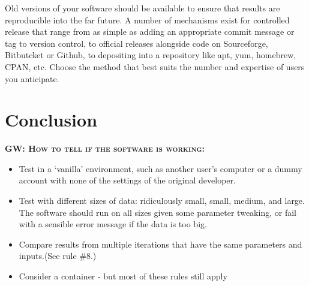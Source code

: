 \documentclass[10pt]{article}
\newcommand{\fixme}[2]{\textsc{\textbf{{#1}: {#2}}}}
\begin{document}
Old versions of your software should be available to ensure that results
are reproducible into the far future. A number of mechanisms exist for
controlled release that range from as simple as adding an appropriate
commit message or tag to version control, to official releases alongside
code on Sourceforge, Bitbutcket or Github, to depositing into a
repository like apt, yum, homebrew, CPAN, etc. Choose the method that
best suits the number and expertise of users you anticipate.

\section*{Conclusion}

\fixme{GW}{How to tell if the software is working:}

\begin{itemize}
\item
  Test in a `vanilla' environment, such as another user's computer or a
  dummy account with none of the settings of the original developer.
\item
  Test with different sizes of data: ridiculously small, small, medium,
  and large. The software should run on all sizes given some parameter
  tweaking, or fail with a sensible error message if the data is too
  big.
\item
  Compare results from multiple iterations that have the same parameters
  and inputs.(See rule \#8.)
\item
  Consider a container - but most of these rules still apply
\end{itemize}


\end{document}
